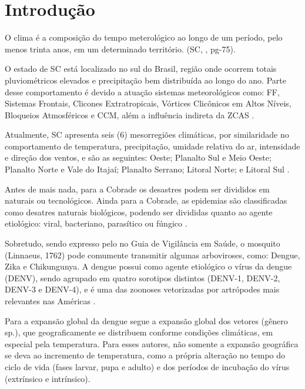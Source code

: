 \chapter{Introdução}

\indent O clima é a composição do tempo meterológico ao longo de um período, pelo menos trinta anos, em um determinado território. (\acrlong{SC}, \citeyear{AtlasSCnatureza}, pg-75).

\indent O estado de \acrfull{SC} está localizado no sul do Brasil, região onde ocorrem totais pluviométricos elevados e precipitação bem distribuída ao longo do ano. Parte desse comportamento é devido a atuação sistemas meteorológicos como: \acrfull{FF}, Sistemas Frontais, Clicones Extratropicais, Vórtices Clicônicos em Altos Níveis, Bloqueios Atmosféricos e \acrfull{CCM}, além a influência indireta da \acrfull{ZCAS} \cite{reboita2010}.

\indent Atualmente, \acrlong{SC} apresenta seis (6) mesorregiões climáticas, por similaridade no comportamento de temperatura, precipitação, umidade relativa do ar, intensidade e direção dos ventos, e são as seguintes: Oeste; Planalto Sul e Meio Oeste; Planalto Norte e Vale do Itajaí; Planalto Serrano; Litoral Norte; e Litoral Sul \cite{Guerra2023Regionalizacao}.

\indent Antes de mais nada, para a \acrfull{Cobrade} os desastres podem ser divididos em naturais ou tecnológicos. Ainda para a \acrshort{Cobrade}, as epidemias são classificadas como desatres naturais biológicos, podendo ser divididas quanto ao agente etiológico: viral, bacteriano, parasítico ou fúngico \cite{GIRD}.

\indent Sobretudo, sendo expresso pelo  no Guia de Vigilância em Saúde, o mosquito  (Linnaeus, 1762) pode comumente transmitir algumas arboviroses, como: Dengue, Zika e Chikungunya. A dengue possui como agente etiológico o vírus da dengue (\acrfull{DENV}), sendo agrupado em quatro sorotipos distintos (\acrshort{DENV}-1, \acrshort{DENV}-2, \acrshort{DENV}-3 e \acrshort{DENV}-4), e é uma das zoonoses vetorizadas por artrópodes mais relevantes nas Américas \cite{GuiaVigSaúde22}.

\indent Para  a expansão global da dengue segue a expansão global dos vetores (gênero  sp.), que geograficamente se distribuem conforme condições climáticas, em especial pela temperatura. Para esses autores, não somente a expansão geográfica se deva ao incremento de temperatura, como a própria alteração no tempo do ciclo de vida (fases larvar, pupa e adulto) e dos períodos de incubação do vírus (extrínsico e intrínsico).

